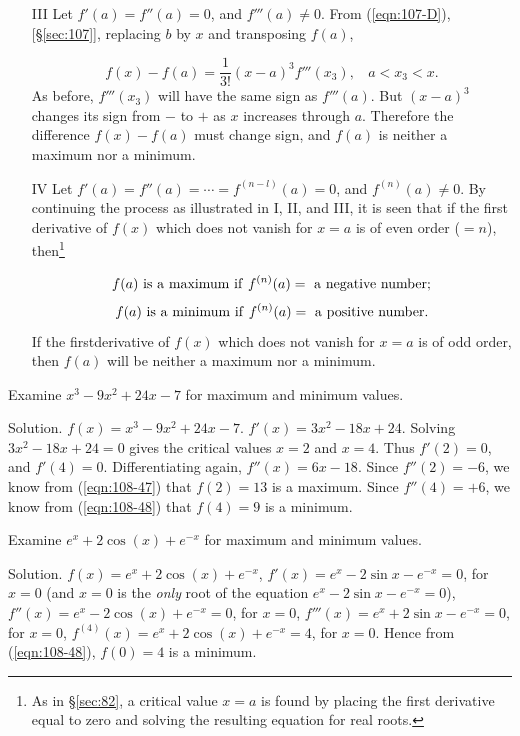\begin{itemize}
\item[III]
Let $f'(a) = f''(a) = 0$, and $f'''(a) \ne 0$.
From (\ref{eqn:107-D}), [\S \ref{sec:107}], replacing $b$ by $x$ 
and transposing $f(a)$,

\begin{equation}
\label{eqn:108G}
f(x)-f(a) = \frac{1}{3!} (x-a)^3 f'''(x_3),\ \ \ \ a < x_3 < x.
\end{equation}
As before, $f'''(x_3)$ will have the same sign as $f'''(a)$. But 
$(x-a)^3$ changes its sign from $-$ to $+$ as $x$ increases through $a$. 
Therefore the difference
$f(x)-f(a)$
must change sign, and $f(a)$ is neither a maximum nor a minimum.

\item[IV]
Let $f'(a) = f''(a) = \cdots = f^{(n-l)}(a) = 0$, and $f^{(n)}(a) \ne 0$.
By continuing the process as illustrated in I, II, and III, it is 
seen that if the first derivative of $f(x)$ which does not vanish for 
$x = a$ is of even order ($= n$), then\footnote{As in \S \ref{sec:82}, 
a critical value $x = a$ is found by placing the first derivative equal 
to zero and solving the resulting equation for real roots.}

\begin{equation}
\label{eqn:108-47} 	
f(a)\ {\rm is\ a\ maximum\ if}\ f^{(n)}(a) =\ {\rm a\ negative\ number};
\end{equation}
\begin{equation}
\label{eqn:108-48} 	
f(a)\ {\rm is\ a\ minimum\ if}\ f^{(n)}(a) =\ {\rm a\ positive\ number}.
\end{equation}
If the firstderivative of $f(x)$ which does not vanish for $x = a$ is of odd order, 
then $f(a)$ will be neither a maximum nor a minimum.
\end{itemize}

\begin{example}
Examine $x^3-9x^2 + 24x-7$ for maximum and minimum values.

Solution. $f(x) = x^3-9x^2 + 24x-7$.
$f'(x) = 3x^2-18x + 24$.
Solving $3x^2-18x + 24 = 0$
gives the critical values $x = 2$ and $x = 4$. Thus
$f'(2) = 0$, and $f'(4) = 0$.
Differentiating again, 	$f''(x) = 6x-18$.
Since $f''(2) =-6$, we know from (\ref{eqn:108-47}) that $f(2) = 13$ is a maximum.
Since $f''(4) = + 6$, we know from (\ref{eqn:108-48}) that $f(4) = 9$ is a minimum.
\end{example}

\begin{example}
Examine $e^x + 2\cos(x) + e^{-x}$ for maximum and minimum values.

Solution. $f(x) = e^x + 2\cos(x) + e^{-x}$,
$f'(x) = e^x-2\sin x-e^{-x} = 0$, for $x = 0$
(and $x = 0$ is the {\it only} root of the equation $e^x-2\sin x-e^{-x} = 0$),
  	$f''(x) = e^x - 2\cos(x) + e^{-x} = 0$, for $x = 0$,
  	$f'''(x) = e^x+2\sin x-e^{-x} = 0$, for $x = 0$,
  	$f^{(4)}(x) = e^x + 2\cos(x) + e^{-x} = 4$, for $x = 0$.
Hence from (\ref{eqn:108-48}), $f(0) = 4$ is a minimum.
\end{example}

